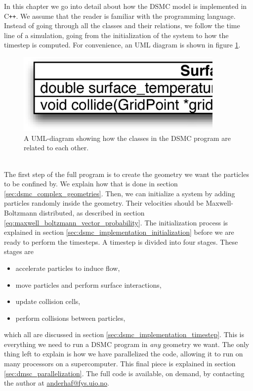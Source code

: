 In this chapter we go into detail about how the DSMC model is implemented in C{}\verb!++!. We assume that the reader is familiar with the programming language. Instead of going through all the classes and their relations, we follow the time line of a simulation, going from the initialization of the system to how the timestep is computed. For convenience, an UML diagram is shown in figure \ref{fig:dsmc_uml_diagram}.
\begin{figure}[h]
\begin{center}
\includegraphics[width=0.9\textwidth, trim=0cm 0cm 0cm 0cm, clip]{DSMC/figures/dsmcuml.eps}
\end{center}
\caption{A UML-diagram showing how the classes in the DSMC program are related to each other.}
\label{fig:dsmc_uml_diagram}
\end{figure}
\\
The first step of the full program is to create the geometry we want the particles to be confined by. We explain how that is done in section \ref{sec:dsmc_complex_geometries}. Then, we can initialize a system by adding particles randomly inside the geometry. Their velocities should be Maxwell-Boltzmann distributed, as described in section \ref{eq:maxwell_boltzmann_vector_probability}. The initialization process is explained in section \ref{sec:dsmc_implementation_initialization} before we are ready to perform the timesteps. A timestep is divided into four stages. These stages are
\begin{itemize}
    \item accelerate particles to induce flow,
    \item move particles and perform surface interactions,
    \item update collision cells,
    \item perform collisions between particles,
\end{itemize}
which all are discussed in section \ref{sec:dsmc_implementation_timestep}. This is everything we need to run a DSMC program in \textit{any} geometry we want. The only thing left to explain is how we have parallelized the code, allowing it to run on many processors on a supercomputer. This final piece is explained in section \ref{sec:dmsc_parallelization}. The full code is available, on demand, by contacting the author at \url{anderhaf@fys.uio.no}.
